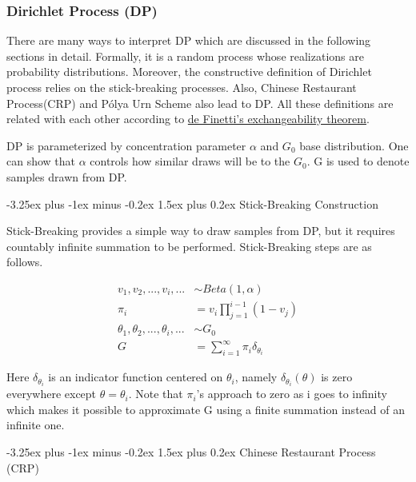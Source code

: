 \documentclass[12pt, a4paper]{article}
\makeatletter
\renewcommand{\paragraph}{\@startsection{paragraph}{4}{0ex}%
    {-3.25ex plus -1ex minus -0.2ex}%
    {1.5ex plus 0.2ex}%
    {\normalfont\normalsize\bfseries}}
\makeatother
\begin{document}
\subsubsection{Dirichlet Process (DP)}

There are many ways to interpret DP which are discussed in the following sections in detail. Formally, it is a random process
whose realizations are probability distributions. Moreover, the constructive
definition of Dirichlet process relies on the stick-breaking processes. Also,
Chinese Restaurant Process(CRP) and Pólya Urn Scheme also lead to DP.
All these definitions are related with each other according to
\href{https://en.wikipedia.org/wiki/De_Finetti\%27s_theorem}{de
Finetti's exchangeability theorem}.

DP is parameterized by concentration parameter \(\alpha\) and \(G_0\)
base distribution. One can show that \(\alpha\) controls how similar
draws will be to the \(G_0\). G is used to denote samples drawn from
DP.


\paragraph{Stick-Breaking Construction}

Stick-Breaking provides a simple way to draw samples from DP, but it requires countably infinite summation to be performed. Stick-Breaking steps are
as follows.

\begin{align}
v_1,v_2,...,v_i,... & \sim Beta(1,\alpha) \\
\pi_i &= v_i \prod_{j=1}^{i-1}(1-v_j) \\ 
\theta_1,\theta_2,...,\theta_i,... & \sim G_0 \\
G & = \sum_{i=1}^{\infty}\pi_i\delta_{\theta_i}
\end{align}

Here \(\delta_{\theta_i}\) is an indicator function centered on
\(\theta_i\), namely \(\delta_{\theta_i}(\theta)\) is zero everywhere
except \(\theta=\theta_i\). Note that \(\pi_i\)'s approach to zero
as i goes to infinity which makes it possible to approximate G using a finite
summation instead of an infinite one.


\paragraph{Chinese Restaurant Process (CRP)}
\end{document}
